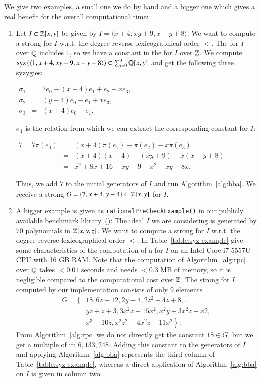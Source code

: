\begin{example}
We give two examples, a small one we do by hand and a bigger one which gives a
real benefit for the overall computational time:
\begin{enumerate}
\item Let $I \subset \mathbb{Z}[x,y]$ be given by $I=\langle x+4, xy+9, x-y+8\rangle$.
We want to compute a strong \stb for $I$ w.r.t. the degree reverse-lexicographical
order $<$. The \stb for $I$ over $\mathbb{Q}$ includes $1$, so we have a constant in the
\stb for $I$ over $\mathbb{Z}$. We compute $\mathrm{syz}\left({\langle 1, x+4, xy+9, x-y+8\rangle}\right)
\subset \sum_{i=0}^3 \mathbb{Q}[x,y]$ and get the following three syzygies:
\begin{center}
$
\begin{array}{rcl}
\sigma_1 & = & 7 e_0 - (x+4) e_1 + e_2 + x e_3,\\
\sigma_2 & = & (y-4) e_0 - e_1 + x e_3,\\
\sigma_3 & = & (x+4) e_0 - e_1.
\end{array}
$
\end{center}
$\sigma_1$ is the relation from which we can extract the corresponding constant
for $I$:
\begin{center}
$
\begin{array}{rcl}
7 = 7 \pi(e_0) &=& (x+4) \pi(e_1) - \pi(e_2) - x \pi(e_3)\\
  &=& (x+4)(x+4) - (xy+9) - x(x-y+8)\\
  &=& x^2+8x+16 - xy -9 - x^2 + xy -8x.
\end{array}
$
\end{center}
Thus, we add $7$ to the initial generators of $I$ and run
Algorithm~\ref{alg:bba}. We receive a strong \stb $G = \{7, x+4, y-4\} \subset
\mathbb{Z}[x,y]$ for $I$.
\item A bigger example is given as \texttt{rationalPreCheckExample()} in our
publicly available benchmark library~(\cite{singular-benchmarks}): The ideal $I$
we are considering is generated by $70$ polynomials in $\mathbb{Z}[x,y,z]$. We want to
compute a strong \stb for $I$ w.r.t. the degree reverse-lexicographical order $<$.
In Table~\ref{table:syz-example} give some characteristics of the computation
of a \stb for $I$ on an Intel Core
i7-5557U CPU with 16 GB RAM. Note that the computation of
Algorithm~\ref{alg:rpc} over $\mathbb{Q}$ takes $<0.01$ seconds and needs $<0.3$ MB of
memory, so it is
negligible compared to the computational cost over $\mathbb{Z}$. The strong \stb for $I$ computed by
our implementation consists of only $9$ elements
\begin{align*}
G = \Big\{&18, 6z-12, 2y-4, 2z^2+4z+8,.\\
     &yz+z+3, 3x^2z-15x^2, x^2y+3x^2z+x2,\\
     &\left.x^3+10z, x^2z^2-4x^2z-11x^2\right\}.
\end{align*}
From Algorithm~\ref{alg:rpc} we do not directly get the constant $18 \in G$, but
we get a multiple of it: $6,133,248$. Adding this constant to the generators of
$I$ and applying Algorithm~\ref{alg:bba} represents the third column of
Table~\ref{table:syz-example}, whereas a direct application of
Algorithm~\ref{alg:bba} on $I$ is given in column two.
\end{enumerate}
\end{example}

